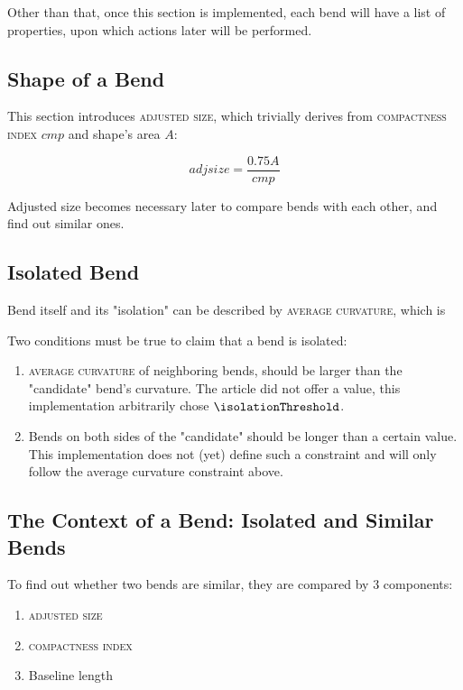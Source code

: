 \documentclass[a4paper]{article}
\begin{document}
Other than that, once this section is implemented, each bend will have a list
of properties, upon which actions later will be performed.

\subsection{Shape of a Bend}

This section introduces \textsc{adjusted size}, which trivially derives from
\textsc{compactness index} $cmp$ and shape's area $A$:

\[
    adjsize = \frac{0.75 A}{cmp}
\]

Adjusted size becomes necessary later to compare bends with each other, and
find out similar ones.

\subsection{Isolated Bend}

Bend itself and its "isolation" can be described by \textsc{average curvature},
which is 

Two conditions must be true to claim that a bend is isolated:

\begin{enumerate}
    \item \textsc{average curvature} of neighboring bends, should be larger
        than the "candidate" bend's curvature. The article did not offer a
        value, this implementation arbitrarily chose $\isolationThreshold$.

    \item Bends on both sides of the "candidate" should be longer than a
        certain value. This implementation does not (yet) define such a
        constraint and will only follow the average curvature constraint above.
\end{enumerate}

\subsection{The Context of a Bend: Isolated and Similar Bends}

To find out whether two bends are similar, they are compared by 3 components:

\begin{enumerate}
    \item \textsc{adjusted size}
    \item \textsc{compactness index}
    \item Baseline length
\end{enumerate}
\end{document}
